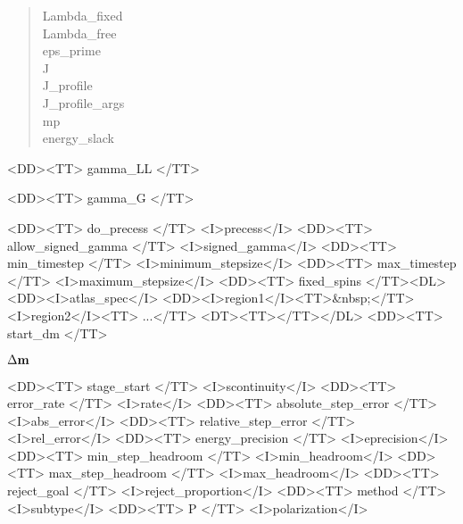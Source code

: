 \begin{description}
\begin{latexonly}
\begin{quote}
    \bi Lambda\_fixed          \\
    \bi Lambda\_free           \\
    \bi eps\_prime             \\
    \bi J                      \\
    \bi J\_profile             \\
    \bi J\_profile\_args       \\
    \bi mp                     \\
    \bi energy\_slack          \\
   \ccb
   \end{quote}
   \end{latexonly}%
   \begin{htmlonly}
   \begin{rawhtml}
   <BLOCKQUOTE><DL><DT>
   <TT>Specify Oxs_SpinXferEvolve:</TT><I>name</I> <TT>{</TT>
   <DD><TT> alpha </TT>
   \end{rawhtml}
   \abovemath{\alpha}
   \begin{rawhtml}
   <DD><TT> gamma_LL </TT>
   \end{rawhtml}
   \abovemath{\bar{\gamma}}
   \begin{rawhtml}
   <DD><TT> gamma_G </TT>
   \end{rawhtml}
   \abovemath{\gamma}
   \begin{rawhtml}
   <DD><TT> do_precess </TT> <I>precess</I>
   <DD><TT> allow_signed_gamma </TT> <I>signed_gamma</I>
   <DD><TT> min_timestep </TT> <I>minimum_stepsize</I>
   <DD><TT> max_timestep </TT> <I>maximum_stepsize</I>
   <DD><TT> fixed_spins {</TT><DL>
       <DD><I>atlas_spec</I>
       <DD><I>region1</I><TT>&nbsp;</TT><I>region2</I><TT> ...</TT>
       <DT><TT>}</TT></DL>
   <DD><TT> start_dm </TT>
   \end{rawhtml}
   $\Delta \textbf{m}$
   \begin{rawhtml}
   <DD><TT> stage_start </TT> <I>scontinuity</I>
   <DD><TT> error_rate </TT> <I>rate</I>
   <DD><TT> absolute_step_error </TT> <I>abs_error</I>
   <DD><TT> relative_step_error </TT> <I>rel_error</I>
   <DD><TT> energy_precision </TT> <I>eprecision</I>
   <DD><TT> min_step_headroom </TT> <I>min_headroom</I>
   <DD><TT> max_step_headroom </TT> <I>max_headroom</I>
   <DD><TT> reject_goal </TT> <I>reject_proportion</I>
   <DD><TT> method </TT> <I>subtype</I>
   <DD><TT> P </TT> <I>polarization</I>

\end{rawhtml}
\end{htmlonly}
\end{description}
